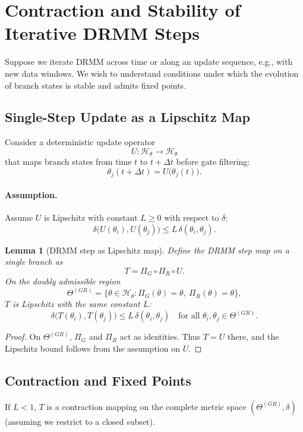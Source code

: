 \documentclass[11pt, a4paper]{article}
\newtheorem{lemma}[theorem]{Lemma}
\begin{document}
\section{Contraction and Stability of Iterative DRMM Steps}

Suppose we iterate DRMM across time or along an update sequence, e.g., with new data windows.
We wish to understand conditions under which the evolution of branch states is stable and admits fixed points.

\subsection{Single-Step Update as a Lipschitz Map}

Consider a deterministic update operator
\[
U : \mathcal{H}_\theta \to \mathcal{H}_\theta
\]
that maps branch states from time $t$ to $t+\Delta t$ before gate filtering:
\[
\theta_j(t+\Delta t) = U\bigl(\theta_j(t)\bigr).
\]

\paragraph{Assumption.}
Assume $U$ is Lipschitz with constant $L \ge 0$ with respect to $\delta$:
\[
\delta\bigl(U(\theta_i),U(\theta_j)\bigr) \le L \,\delta(\theta_i,\theta_j).
\]

\begin{lemma}[DRMM step as Lipschitz map]
Define the DRMM step map on a single branch as
\[
T = \Pi_G \circ \Pi_R \circ U.
\]
On the doubly admissible region
\[
\Theta^{(GR)} = \{\theta \in \mathcal{H}_\theta : \Pi_G(\theta) = \theta,\ \Pi_R(\theta) = \theta\},
\]
$T$ is Lipschitz with the same constant $L$:
\[
\delta\bigl(T(\theta_i),T(\theta_j)\bigr) \le L \,\delta(\theta_i,\theta_j)
\quad
\text{for all }
\theta_i,\theta_j \in \Theta^{(GR)}.
\]
\end{lemma}

\begin{proof}
On $\Theta^{(GR)}$, $\Pi_G$ and $\Pi_R$ act as identities.
Thus $T = U$ there, and the Lipschitz bound follows from the assumption on $U$.
\end{proof}

\subsection{Contraction and Fixed Points}

If $L < 1$, $T$ is a contraction mapping on the complete metric space $(\Theta^{(GR)},\delta)$ (assuming we restrict to a closed subset).
\end{document}
